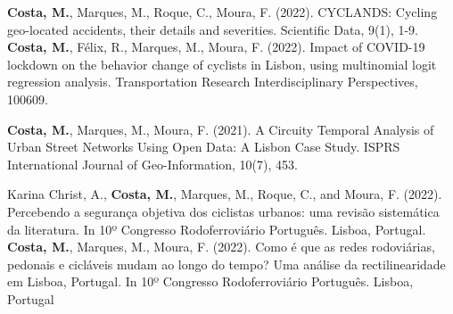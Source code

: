 



\begin{cvpublications}
  \cvpublication
    {\textbf{Costa, M.}, Marques, M., Roque, C., Moura, F. (2022). CYCLANDS: Cycling geo-located accidents, their details and severities. Scientific Data, 9(1), 1-9.}
  \cvpublication
    {\textbf{Costa, M.}, Félix, R., Marques, M., Moura, F. (2022). Impact of COVID-19 lockdown on the behavior change of cyclists in Lisbon, using multinomial logit regression analysis. Transportation Research Interdisciplinary Perspectives, 100609.}

\end{cvpublications}



\begin{cvpublications}
  \cvpublication
    {\textbf{Costa, M.}, Marques, M., Moura, F. (2021). A Circuity Temporal Analysis of Urban Street Networks Using Open Data: A Lisbon Case Study. ISPRS International Journal of Geo-Information, 10(7), 453.}

\end{cvpublications}




\begin{cvpublications}
  \cvpublication
    {Karina Christ, A., \textbf{Costa, M.}, Marques, M., Roque, C., and Moura, F. (2022). Percebendo a segurança objetiva dos ciclistas urbanos: uma revisão sistemática da literatura. In 10º Congresso Rodoferroviário Português. Lisboa, Portugal.}
  \cvpublication
    {\textbf{Costa, M.}, Marques, M., Moura, F. (2022). Como é que as redes rodoviárias, pedonais e cicláveis mudam ao longo do tempo? Uma análise da rectilinearidade em Lisboa, Portugal. In 10º Congresso Rodoferroviário Português. Lisboa, Portugal}

\end{cvpublications}

